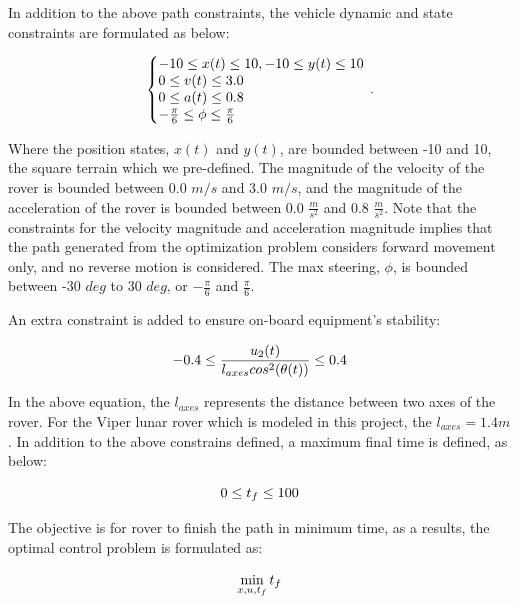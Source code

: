 \documentclass{article}
\begin{document}
In addition to the above path constraints, the vehicle dynamic and state constraints are formulated as below:

\begin{equation}
	\label{equ:car_dyn_con}
	\left\{\begin{array}{@{}l@{}}
		-10 \leq x(t) \leq 10, -10 \leq y(t) \leq 10  \\
		 0 \leq v(t) \leq 3.0 \\
		 0 \leq a(t) \leq 0.8 \\
		 -\frac{\pi}{6} \leq \phi \leq \frac{\pi}{6} \\
	\end{array}\right.\,.
\end{equation}

Where the position states, $x(t)$ and $y(t)$, are bounded between -10 and 10, the square terrain which we pre-defined. The magnitude of the velocity of the rover is bounded between 0.0 $m/s$ and 3.0 $m/s$, and the magnitude of the acceleration of the rover is bounded between 0.0 $\frac{m}{s^2}$ and 0.8 $\frac{m}{s^2}$. Note that the constraints for the velocity magnitude and acceleration magnitude implies that the path generated from the optimization problem considers forward movement only, and no reverse motion is considered. The max steering, $\phi$, is bounded between -30 $deg$ to 30 $deg$, or $-\frac{\pi}{6}$ and $\frac{\pi}{6}$.  

An extra constraint is added to ensure on-board equipment's stability:

\begin{equation}
	\label{equ:car_stability}
	-0.4 \leq \frac{u_{2}(t)}{l_{axes}cos^{2}(\theta(t) )} \leq 0.4 \\
\end{equation}

In the above equation, the $l_{axes}$ represents the distance between two axes of the rover. For the Viper lunar rover which is modeled in this project, the $l_{axes} = 1.4 m$. In addition to the above constrains defined, a maximum final time is defined, as below:

\begin{equation}
	\label{equ:time_cons}
	0 \leq t_{f} \leq 100 \\
\end{equation}

The objective is for rover to finish the path in minimum time, as a results, the optimal control problem is formulated as:

\begin{equation}
	\label{equ:car_opt}
	\min_{x,u,t_{f}}t_{f}\\
\end{equation}
\end{document}
